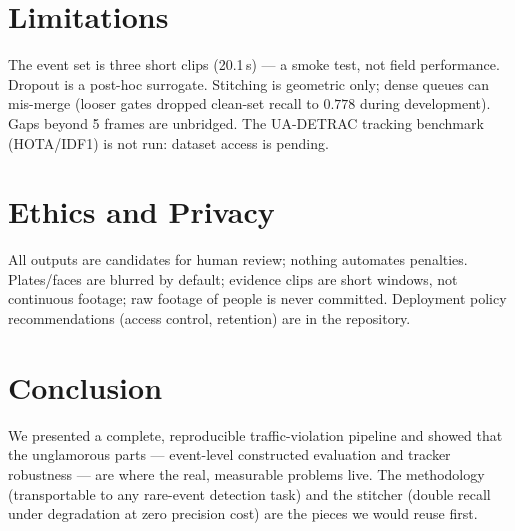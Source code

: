 \documentclass[conference]{IEEEtran}
\begin{document}
\section{Limitations}
The event set is three short clips (20.1\,s) --- a smoke test, not field
performance. Dropout is a post-hoc surrogate. Stitching is geometric only;
dense queues can mis-merge (looser gates dropped clean-set recall to $0.778$
during development). Gaps beyond 5 frames are unbridged. The UA-DETRAC
tracking benchmark (HOTA/IDF1) is not run: dataset access is pending.

\section{Ethics and Privacy}
All outputs are candidates for human review; nothing automates penalties.
Plates/faces are blurred by default; evidence clips are short windows, not
continuous footage; raw footage of people is never committed. Deployment
policy recommendations (access control, retention) are in the repository.

\section{Conclusion}
We presented a complete, reproducible traffic-violation pipeline and showed
that the unglamorous parts --- event-level constructed evaluation and tracker
robustness --- are where the real, measurable problems live. The methodology
(transportable to any rare-event detection task) and the stitcher
(double recall under degradation at zero precision cost) are the pieces we
would reuse first.



\end{document}
